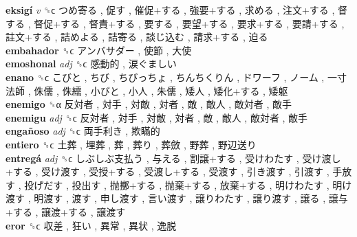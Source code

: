 \textbf{eksigí} \emph{v}  ␝ϲ   つめ寄る ,  促す ,  催促+する ,  強要+する ,  求める ,  注文+する ,  督する ,  督促+する ,  督責+する ,  要する ,  要望+する ,  要求+する ,  要請+する ,  註文+する ,  詰めよる ,  詰寄る ,  談じ込む ,  請求+する ,  迫る   \\
\textbf{embahador} ␝ϲ   アンバサダー ,  使節 ,  大使   \\
\textbf{emoshonal} \emph{adj}  ␝ϲ   感動的 ,  涙ぐましい   \\
\textbf{enano} ␝ϲ   こびと ,  ちび ,  ちびっちょ ,  ちんちくりん ,  ドワーフ ,  ノーム ,  一寸法師 ,  侏儒 ,  侏繻 ,  小びと ,  小人 ,  朱儒 ,  矮人 ,  矮化+する ,  矮躯   \\
\textbf{enemigo} ␝α   反対者 ,  対手 ,  対敵 ,  対者 ,  敵 ,  敵人 ,  敵対者 ,  敵手   \\
\textbf{enemigu} \emph{adj}  ␝ϲ   反対者 ,  対手 ,  対敵 ,  対者 ,  敵 ,  敵人 ,  敵対者 ,  敵手   \\
\textbf{engañoso} \emph{adj}  ␝ϲ   両手利き ,  欺瞞的   \\
\textbf{entiero} ␝ϲ   土葬 ,  埋葬 ,  葬 ,  葬り ,  葬斂 ,  野葬 ,  野辺送り   \\
\textbf{entregá} \emph{adj}  ␝ϲ   しぶしぶ支払う ,  与える ,  割譲+する ,  受けわたす ,  受け渡し+する ,  受け渡す ,  受授+する ,  受渡し+する ,  受渡す ,  引き渡す ,  引渡す ,  手放す ,  投げだす ,  投出す ,  抛擲+する ,  抛棄+する ,  放棄+する ,  明けわたす ,  明け渡す ,  明渡す ,  渡す ,  申し渡す ,  言い渡す ,  譲りわたす ,  譲り渡す ,  譲る ,  譲与+する ,  譲渡+する ,  譲渡す   \\
\textbf{eror} ␝ϲ   収差 ,  狂い ,  異常 ,  異状 ,  逸脱   \\
